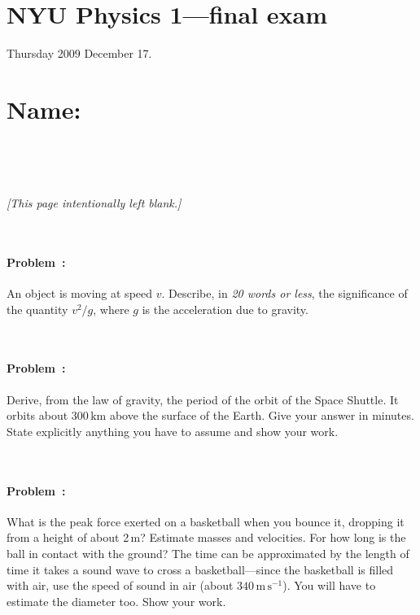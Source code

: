 \documentclass[12pt]{article}
\newcommand{\m}{\mathrm{m}}
\newcommand{\s}{\mathrm{s}}
\newcommand{\km}{\mathrm{km}}
\newcommand{\mps}{\m\,\s^{-1}}
\newcounter{problem}
\begin{document}
\section*{NYU Physics 1---final exam}

Thursday 2009 December 17.

\section*{Name:}

~ \vfill ~

\clearpage

~ \vfill ~

\begin{center}
\textsl{[This page intentionally left blank.]}
\end{center}

~ \vfill ~

\clearpage

\paragraph{Problem~\theproblem:}%
An object is moving at speed $v$.  Describe, in \emph{20 words or
  less}, the significance of the quantity $v^2/g$, where $g$ is the
acceleration due to gravity.

~ \vfill ~

\paragraph{Problem~\theproblem:}%
Derive, from the law of gravity, the period of the orbit of the Space
Shuttle.  It orbits about $300\,\km$ above the surface of the Earth.
Give your answer in minutes.  State explicitly anything you have to
assume and show your work.

~ \vfill ~

\clearpage

\paragraph{Problem~\theproblem:}%
What is the peak force exerted on a basketball when you bounce it,
dropping it from a height of about 2\,m?  Estimate masses and
velocities.  For how long is the ball in contact with the ground?  The
time can be approximated by the length of time it takes a sound wave
to cross a basketball---since the basketball is filled with air, use
the speed of sound in air (about $340\,\mps$).  You will have to
estimate the diameter too.  Show your work.
\end{document}
